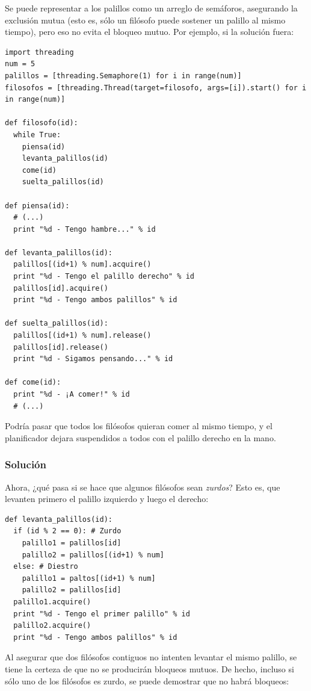 \documentclass[11pt,fleqn]{book} %
\begin{document}
   Se puede representar a los palillos como un arreglo de semáforos,
   asegurando la exclusión mutua (esto es, sólo un filósofo puede
   sostener un palillo al mismo tiempo), pero eso no evita el bloqueo
   mutuo. Por ejemplo, si la  solución fuera:


\begin{verbatim}
import threading
num = 5
palillos = [threading.Semaphore(1) for i in range(num)]
filosofos = [threading.Thread(target=filosofo, args=[i]).start() for i in range(num)]

def filosofo(id):
  while True:
    piensa(id)
    levanta_palillos(id)
    come(id)
    suelta_palillos(id)

def piensa(id):
  # (...)
  print "%d - Tengo hambre..." % id

def levanta_palillos(id):
  palillos[(id+1) % num].acquire()
  print "%d - Tengo el palillo derecho" % id
  palillos[id].acquire()
  print "%d - Tengo ambos palillos" % id

def suelta_palillos(id):
  palillos[(id+1) % num].release()
  palillos[id].release()
  print "%d - Sigamos pensando..." % id

def come(id):
  print "%d - ¡A comer!" % id
  # (...)
\end{verbatim}

   Podría pasar que todos los filósofos quieran comer al mismo tiempo,
   y el planificador dejara suspendidos a todos con el palillo derecho
   en la mano.
\subsubsection{Solución}
\label{sec-3-3-7-4}


   Ahora, ¿qué pasa si se hace que algunos filósofos sean \emph{zurdos}?
   Esto es, que levanten primero el palillo izquierdo y luego el
   derecho:


\begin{verbatim}
def levanta_palillos(id):
  if (id % 2 == 0): # Zurdo
    palillo1 = palillos[id]
    palillo2 = palillos[(id+1) % num]
  else: # Diestro
    palillo1 = paltos[(id+1) % num]
    palillo2 = palillos[id]
  palillo1.acquire()
  print "%d - Tengo el primer palillo" % id
  palillo2.acquire()
  print "%d - Tengo ambos palillos" % id
\end{verbatim}

   Al asegurar que dos filósofos contiguos no intenten levantar el
   mismo palillo, se tiene la certeza de que no se producirán bloqueos
   mutuos. De hecho, incluso si sólo uno de los filósofos es zurdo,
   se puede demostrar que no habrá bloqueos:
\end{document}
